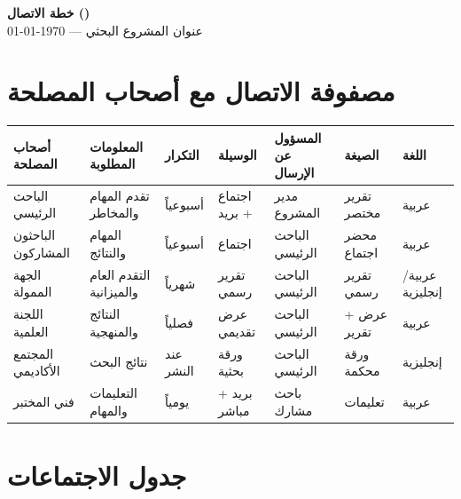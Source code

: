\documentclass[11pt,a4paper,landscape]{article}
\begin{document}
\begin{center}
{\LARGE\bfseries خطة الاتصال ()}\\[0.3em]
{\large عنوان المشروع البحثي — \today}\\[1em]
\end{center}

\section{مصفوفة الاتصال مع أصحاب المصلحة}
\label{sec:matrix}

\begin{table}[H]
\centering
\footnotesize
\renewcommand{\arraystretch}{1.5}
\begin{tabularx}{\textwidth}{L{3cm} L{3.5cm} C{2cm} C{2cm} L{3cm} L{3cm} C{2cm}}
\toprule
\textbf{أصحاب المصلحة} & \textbf{المعلومات المطلوبة} & \textbf{التكرار} & \textbf{الوسيلة} & \textbf{المسؤول عن الإرسال} & \textbf{الصيغة} & \textbf{اللغة} \\
\midrule
الباحث الرئيسي & تقدم المهام والمخاطر & أسبوعياً & اجتماع + بريد & مدير المشروع & تقرير مختصر & عربية \\
\midrule
الباحثون المشاركون & المهام والنتائج & أسبوعياً & اجتماع & الباحث الرئيسي & محضر اجتماع & عربية \\
\midrule
الجهة الممولة & التقدم العام والميزانية & شهرياً & تقرير رسمي & الباحث الرئيسي & تقرير رسمي & عربية/إنجليزية \\
\midrule
اللجنة العلمية & النتائج والمنهجية & فصلياً & عرض تقديمي & الباحث الرئيسي & عرض + تقرير & عربية \\
\midrule
المجتمع الأكاديمي & نتائج البحث & عند النشر & ورقة بحثية & الباحث الرئيسي & ورقة محكمة & إنجليزية \\
\midrule
فني المختبر & التعليمات والمهام & يومياً & بريد + مباشر & باحث مشارك & تعليمات & عربية \\
\bottomrule
\end{tabularx}
\end{table}

\section{جدول الاجتماعات}
\label{sec:meetings}
\end{document}

